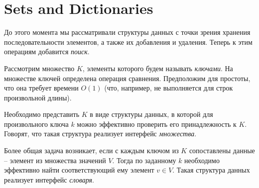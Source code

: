 \documentclass[12pt,a4paper]{report}
\begin{document}


\section*{Sets and Dictionaries}

До этого момента мы рассматривали структуры данных с точки зрения хранения последовательности элементов, а также их добавления и удаления. Теперь к этим операциям добавится {\em поиск}.

Рассмотрим множество $K$, элементы которого будем называть {\em ключами}. На множестве ключей определена операция сравнения. Предположим для простоты, что она требует времени $O(1)$ (что, например, не выполняется для строк произвольной длины).

Необходимо представить $K$ в виде структуры данных, в которой для произвольного ключа $k$ можно эффективно проверить его принадлежность к $K$. Говорят, что такая структура реализует интерфейс {\em множества}.

Более общая задача возникает, если с каждым ключом из $K$ сопоставлены данные -- элемент из множества значений $V$.  Тогда по заданному $k$ необходимо эффективно найти соответствующий ему элемент $v \in V$. Такая структура данных реализует интерфейс {\em словаря}.
\end{document}
